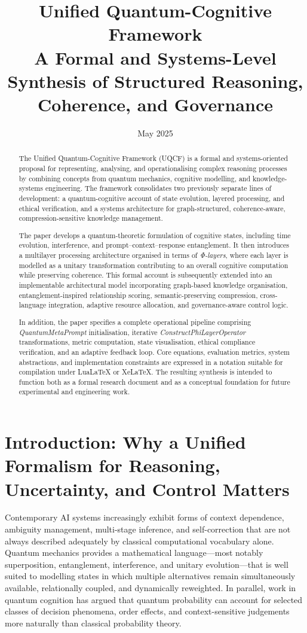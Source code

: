 \documentclass[12pt]{article}
\title{Unified Quantum-Cognitive Framework\\\large A Formal and Systems-Level Synthesis of Structured Reasoning, Coherence, and Governance}
\author{}
\date{May 2025}
\begin{document}
\maketitle

\begin{abstract}
The Unified Quantum-Cognitive Framework (UQCF) is a formal and systems-oriented proposal for representing, analysing, and operationalising complex reasoning processes by combining concepts from quantum mechanics, cognitive modelling, and knowledge-systems engineering. The framework consolidates two previously separate lines of development: a quantum-cognitive account of state evolution, layered processing, and ethical verification, and a systems architecture for graph-structured, coherence-aware, compression-sensitive knowledge management.

The paper develops a quantum-theoretic formulation of cognitive states, including time evolution, interference, and prompt--context--response entanglement. It then introduces a multilayer processing architecture organised in terms of \emph{Φ-layers}, where each layer is modelled as a unitary transformation contributing to an overall cognitive computation while preserving coherence. This formal account is subsequently extended into an implementable architectural model incorporating graph-based knowledge organisation, entanglement-inspired relationship scoring, semantic-preserving compression, cross-language integration, adaptive resource allocation, and governance-aware control logic.

In addition, the paper specifies a complete operational pipeline comprising \textit{QuantumMetaPrompt} initialisation, iterative \textit{ConstructPhiLayerOperator} transformations, metric computation, state visualisation, ethical compliance verification, and an adaptive feedback loop. Core equations, evaluation metrics, system abstractions, and implementation constraints are expressed in a notation suitable for compilation under LuaLaTeX or XeLaTeX. The resulting synthesis is intended to function both as a formal research document and as a conceptual foundation for future experimental and engineering work.
\end{abstract}

\tableofcontents

\section{Introduction: Why a Unified Formalism for Reasoning, Uncertainty, and Control Matters}
Contemporary AI systems increasingly exhibit forms of context dependence, ambiguity management, multi-stage inference, and self-correction that are not always described adequately by classical computational vocabulary alone. Quantum mechanics provides a mathematical language---most notably superposition, entanglement, interference, and unitary evolution---that is well suited to modelling states in which multiple alternatives remain simultaneously available, relationally coupled, and dynamically reweighted. In parallel, work in quantum cognition has argued that quantum probability can account for selected classes of decision phenomena, order effects, and context-sensitive judgements more naturally than classical probability theory.
\end{document}
